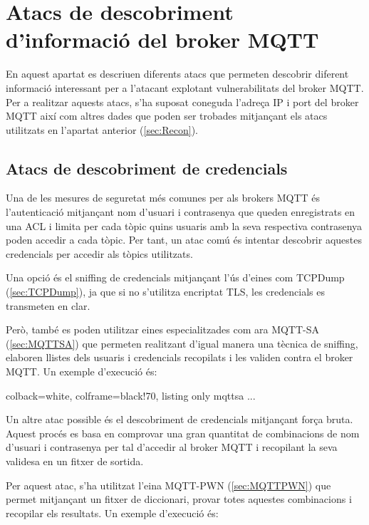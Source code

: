 \section{Atacs de descobriment d’informació del broker MQTT}

En aquest apartat es descriuen diferents atacs que permeten descobrir diferent informació interessant per a l'atacant explotant vulnerabilitats del broker MQTT. Per a realitzar aquests atacs, s'ha suposat coneguda l'adreça IP i port del broker MQTT així com altres dades que poden ser trobades mitjançant els atacs utilitzats en l'apartat anterior (\ref{sec:Recon}).


\subsection{Atacs de descobriment de credencials}

Una de les mesures de seguretat més comunes per als brokers MQTT és l'autenticació mitjançant nom d'usuari i contrasenya que queden enregistrats en una ACL i limita per cada tòpic quins usuaris amb la seva respectiva contrasenya poden accedir a cada tòpic. Per tant, un atac comú és intentar descobrir aquestes credencials per accedir als tòpics utilitzats. 

Una opció és el sniffing de credencials mitjançant l'ús d'eines com TCPDump (\ref{sec:TCPDump}), ja que si no s'utilitza encriptat TLS, les credencials es transmeten en clar.

Però, també es poden utilitzar eines especialitzades com ara MQTT-SA (\ref{sec:MQTTSA}) que permeten realitzant d'igual manera una tècnica de sniffing, elaboren llistes dels usuaris i credencials recopilats i les validen contra el broker MQTT. Un exemple d'execució és:

\begin{tcblisting}{colback=white, colframe=black!70, listing only}
mqttsa ...
\end{tcblisting}

Un altre atac possible és el descobriment de credencials mitjançant força bruta. Aquest procés es basa en comprovar una gran quantitat de combinacions de nom d'usuari i contrasenya per tal d'accedir al broker MQTT i recopilant la seva validesa en un fitxer de sortida.

Per aquest atac, s'ha utilitzat l'eina MQTT-PWN (\ref{sec:MQTTPWN}) que permet mitjançant un fitxer de diccionari, provar totes aquestes combinacions i recopilar els resultats.
Un exemple d'execució és:

